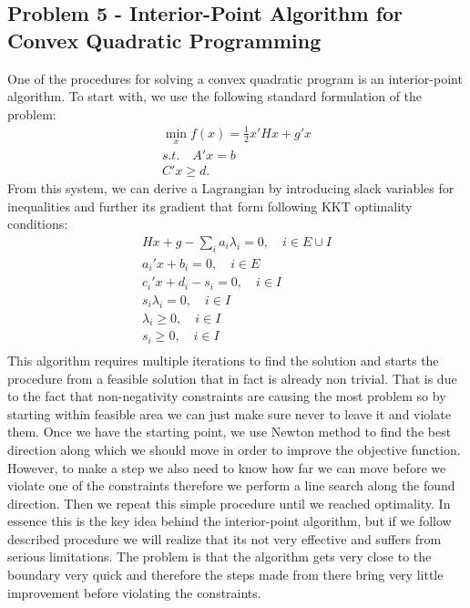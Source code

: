 \newpage
\subsection{Problem 5 - Interior-Point Algorithm for Convex Quadratic
Programming}

One of the procedures for solving a convex quadratic program is an interior-point algorithm. To start with, we use the following standard formulation of the problem:
\begin{equation}
\begin{split}
\min_{x} f(x) = \frac{1}{2} x'Hx + g'x\\
s.t. \quad A'x = b\\
C'x \geq d.
\end{split}
\end{equation}
From this system, we can derive a Lagrangian by introducing slack variables for inequalities and further its gradient that form following KKT optimality conditions:
\begin{equation}
\begin{split}
Hx + g - \sum_{i} a_i \lambda_{i} = 0, \quad i \in E \cup I\\
a_i'x + b_i = 0, \quad i \in E\\
c_i'x + d_i - s_i = 0, \quad i \in I \\
s_i \lambda_{i} = 0, \quad i \in I \\
\lambda_{i} \geq 0, \quad i \in I \\
s_i \geq 0, \quad i \in I \\
\end{split}
\end{equation}
This algorithm requires multiple iterations to find the solution and starts the procedure from a feasible solution that in fact is already non trivial. That is due to the fact that non-negativity constraints are causing the most problem so by starting within feasible area we can just make sure never to leave it and violate them. Once we have the starting point, we use Newton method to find the best direction along which we should move in order to improve the objective function. However, to make a step we also need to know how far we can move before we violate one of the constraints therefore we perform a line search along the found direction. Then we repeat this simple procedure until we reached optimality. In essence this is the key idea behind the interior-point algorithm, but if we follow described procedure we will realize that its not very effective and suffers from serious limitations. The problem is that the algorithm gets very close to the boundary very quick and therefore the steps made from there bring very little improvement before violating the constraints. 

